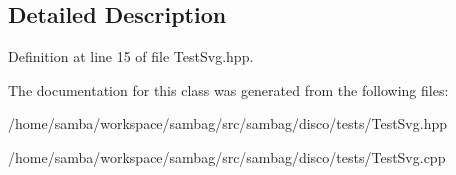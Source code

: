 \subsection{Detailed Description}


Definition at line 15 of file TestSvg.hpp.



The documentation for this class was generated from the following files:\begin{DoxyCompactItemize}
\item 
/home/samba/workspace/sambag/src/sambag/disco/tests/TestSvg.hpp\item 
/home/samba/workspace/sambag/src/sambag/disco/tests/TestSvg.cpp\end{DoxyCompactItemize}
